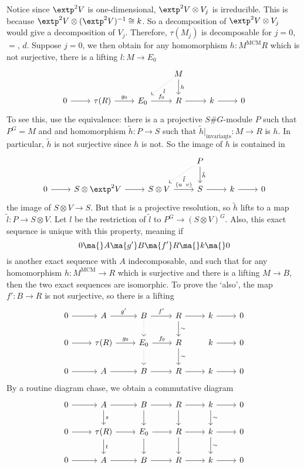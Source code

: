 Notice since $\extp^2 V$ is one-dimensional, $\extp^2 V \otimes V_j$ is irreducible. This is because $\extp^2V \otimes (\extp^2 V)^{-1} \cong k$. So a decomposition of $\extp^2 V \otimes V_j$ would give a decomposition of $V_j$. Therefore, $\tau(M_j)$ is decomposable for $j= 0$, $=$, $d$. Suppose $j=0$, we then obtain for any homomorphism $h: M^{\text{MCM}} R$ which is not surjective, there is a lifting $l: M \to E_0$
	\[
	\begin{tikzcd}
	& & & M \arrow[dotted]{dl}{l} \arrow{d}{h} & & \\
	0 \arrow{r} & \tau(R) \arrow{r}{g_0} & E_0 \arrow{r}{f_0} & R \arrow{r} & k \arrow{r} & 0
	\end{tikzcd}
	\]
To see this, use the equivalence: there is a a projective $S\#G$-module $P$ such that $P^G= M$ and and homomorphism $\tilde{h}: P \to S$ such that $\tilde{h}\big|_{\text{invariants}}: M \to R$ is $h$. In particular, $\tilde{h}$ is not surjective since $h$ is not. So the image of $\tilde{h}$ is contained in
	\[
	\begin{tikzcd}
	& & & P \arrow[dotted]{dl}{\tilde{l}} \arrow{d}{\tilde{h}} & & \\
	0 \arrow{r} & S \otimes \extp^2 V \arrow{r} & S \otimes V \arrow{r}{(u\;\;v)} & S \arrow{r} & k \arrow{r} & 0
	\end{tikzcd}
	\]
the image of $S \otimes V \to S$. But that is a projective resolution, so $\tilde{h}$ lifts to a map $\tilde{l}: P \to S \otimes V$. Let $l$ be the restriction of $\tilde{l}$ to $P^G \to (S  \otimes V)^G$.  Also, this exact sequence is unique with this property, meaning if
	\[
	0 \ma{} A \ma{g'} B \ma{f'} R \ma{} k \ma{} 0
	\]
is another exact sequence with $A$ indecomposable, and such that for any homomorphism $h: M^\text{MCM} \to R$ which is surjective and there is a lifting $M \to B$, then the two exact sequences are isomorphic. To prove the `also', the map $f': B \to R$ is not surjective, so there is a lifting
	\[
	\begin{tikzcd}
	0 \arrow{r} & A \arrow{r}{g'} & B \arrow[dotted]{d} \arrow{r}{f'} & R \arrow{r} \arrow{d}{\sim} & k \arrow{r} & 0 \\
	0 \arrow{r} & \tau(R) \arrow{r}{g_0} & E_0 \arrow{r}{f_0} \arrow[dotted]{d} & R \arrow{d}{\sim} & k \arrow{r} & 0 \\
	0 \arrow{r} & A \arrow{r} & B \arrow{r} & R \arrow{r} & k \arrow{r} & 0 
	\end{tikzcd}
	\]
By a routine diagram chase, we obtain a commutative diagram
	\[
	\begin{tikzcd}
	0 \arrow{r} & A \arrow{r} \arrow{d}{s} & B \arrow{r} \arrow{d} & R \arrow{r} \arrow{d} & k \arrow{r} \arrow{d}{\sim} & 0 \\
	0 \arrow{r} & \tau(R) \arrow{r} \arrow{d}{t} & E_0 \arrow{r} \arrow{d} & R \arrow{r} \arrow{d} & k \arrow{r} \arrow{d}{\sim} & 0 \\
	0 \arrow{r} & A \arrow{r} &  B \arrow{r} & R \arrow{r} & k \arrow{r} & 0
	\end{tikzcd}
	\]
